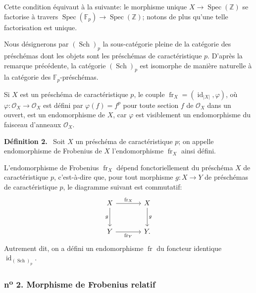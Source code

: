 \documentclass[11pt]{article}
\newenvironment{statement}[1]{\par\medskip\noindent\textbf{#1.}\ }{\par\medskip}
\DeclareMathOperator{\Spec}{Spec}
\providecommand{\OO}{\mathcal{O}}
\providecommand{\id}{\operatorname{id}}
\providecommand{\id}{\operatorname{id}}
\providecommand{\id}{\operatorname{id}}
\providecommand{\id}{\operatorname{id}}
\providecommand{\Spec}{\operatorname{Spec}}
\providecommand{\Spec}{\operatorname{Spec}}
\providecommand{\id}{\operatorname{id}}
\providecommand{\Spec}{\operatorname{Spec}}
\providecommand{\fr}{\operatorname{fr}}
\providecommand{\Sch}{\operatorname{Sch}}
\providecommand{\bF}{\mathbb F}
\providecommand{\bbZ}{\mathbb Z}
\providecommand{\fr}{\operatorname{fr}}
\providecommand{\Sch}{\operatorname{Sch}}
\providecommand{\Spec}{\operatorname{Spec}}
\providecommand{\id}{\operatorname{id}}
\begin{document}
Cette condition équivaut à la suivante: le morphisme unique $X\to\Spec(\bbZ)$ se factorise à travers $\Spec(\bF_p)\to\Spec(\bbZ)$; notons de plus qu'une telle factorisation est unique.

Nous désignerons par $(\Sch)_p$ la sous-catégorie pleine de la catégorie des préschémas dont les objets sont les préschémas de caractéristique $p$. D'après la remarque précédente, la catégorie $(\Sch)_p$ est isomorphe de manière naturelle à la catégorie des $\bF_p$-préschémas.

Si $X$ est un préschéma de caractéristique $p$, le couple $\fr_X=(\id_{|X|},\varphi)$, où $\varphi:\OO_X\longrightarrow\OO_X$ est défini par $\varphi(f)=f^p$ pour toute section $f$ de $\OO_X$ dans un ouvert, est un endomorphisme de $X$, car $\varphi$ est visiblement un endomorphisme du faisceau d'anneaux $\OO_X$.

\begin{statement}{Définition 2}
Soit $X$ un préschéma de caractéristique $p$; on appelle endomorphisme de Frobenius de $X$ l'endomorphisme $\fr_X$ ainsi défini.
\end{statement}

L'endomorphisme de Frobenius $\fr_X$ dépend fonctoriellement du préschéma $X$ de caractéristique $p$, c'est-à-dire que, pour tout morphisme $g:X\to Y$ de préschémas de caractéristique $p$, le diagramme suivant est commutatif:
\[
\begin{tikzcd}[column sep=large,row sep=large]
X \arrow[r,"\fr_X"] \arrow[d,"g"'] & X \arrow[d,"g"]\\
Y \arrow[r,"\fr_Y"'] & Y.
\end{tikzcd}
\]
Autrement dit, on a défini un endomorphisme $\fr$ du foncteur identique $\id_{(\Sch)_p}$.

\subsubsection*{n\textsuperscript{o} 2. Morphisme de Frobenius relatif}
\end{document}
